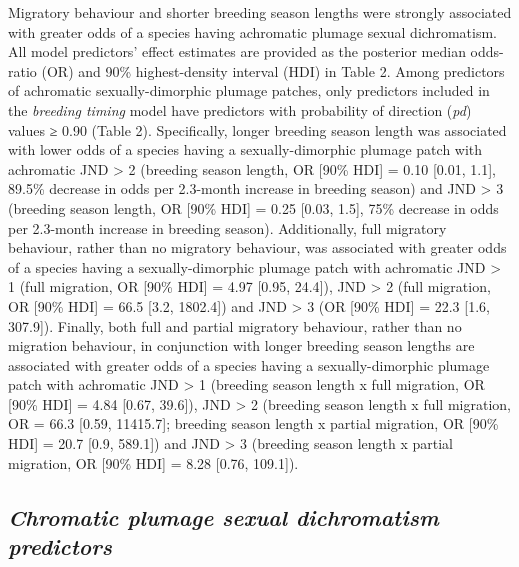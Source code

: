 \documentclass[
  a4paper,
]{article}
\begin{document}
Migratory behaviour and shorter breeding season lengths were strongly
associated with greater odds of a species having achromatic plumage
sexual dichromatism. All model predictors' effect estimates are provided
as the posterior median odds-ratio (OR) and 90\% highest-density
interval (HDI) in Table 2. Among predictors of achromatic
sexually-dimorphic plumage patches, only predictors included in the
\emph{breeding timing} model have predictors with probability of
direction (\emph{pd}) values ≥ 0.90 (Table 2). Specifically, longer
breeding season length was associated with lower odds of a species
having a sexually-dimorphic plumage patch with achromatic JND
\textgreater{} 2 (breeding season length, OR {[}90\% HDI{]} = 0.10
{[}0.01, 1.1{]}, 89.5\% decrease in odds per 2.3-month increase in
breeding season) and JND \textgreater{} 3 (breeding season length, OR
{[}90\% HDI{]} = 0.25 {[}0.03, 1.5{]}, 75\% decrease in odds per
2.3-month increase in breeding season). Additionally, full migratory
behaviour, rather than no migratory behaviour, was associated with
greater odds of a species having a sexually-dimorphic plumage patch with
achromatic JND \textgreater{} 1 (full migration, OR {[}90\% HDI{]} =
4.97 {[}0.95, 24.4{]}), JND \textgreater{} 2 (full migration, OR {[}90\%
HDI{]} = 66.5 {[}3.2, 1802.4{]}) and JND \textgreater{} 3 (OR {[}90\%
HDI{]} = 22.3 {[}1.6, 307.9{]}). Finally, both full and partial
migratory behaviour, rather than no migration behaviour, in conjunction
with longer breeding season lengths are associated with greater odds of
a species having a sexually-dimorphic plumage patch with achromatic JND
\textgreater{} 1 (breeding season length x full migration, OR {[}90\%
HDI{]} = 4.84 {[}0.67, 39.6{]}), JND \textgreater{} 2 (breeding season
length x full migration, OR = 66.3 {[}0.59, 11415.7{]}; breeding season
length x partial migration, OR {[}90\% HDI{]} = 20.7 {[}0.9, 589.1{]})
and JND \textgreater{} 3 (breeding season length x partial migration, OR
{[}90\% HDI{]} = 8.28 {[}0.76, 109.1{]}).

\hypertarget{chromatic-plumage-sexual-dichromatism-predictors}{%
\subsection{\texorpdfstring{\emph{Chromatic plumage sexual dichromatism
predictors}}{Chromatic plumage sexual dichromatism predictors}}\label{chromatic-plumage-sexual-dichromatism-predictors}}
\end{document}
